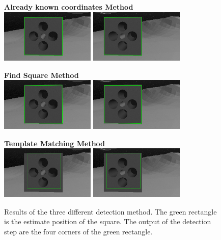 \begin{figure}[H]
	\centering
	
	\textbf{Already known coordinates Method}\\
	\includegraphics[width=4.5cm]{detection/clickDetLeft.png}
	\includegraphics[width=4.5cm]{detection/clickDetRight.png}\\
	\vspace{30px}
	
	\textbf{Find Square Method}\\
	\includegraphics[width=4.5cm]{detection/squareDetLeft.png}
	\includegraphics[width=4.5cm]{detection/squareDetRight.png}\\
	\vspace{30px}
		
	\textbf{Template Matching Method}\\
	\includegraphics[width=4.5cm]{detection/tempDetLeft.png}
	\includegraphics[width=4.5cm]{detection/tempDetRight.png}
	
	\caption[Hole Detection results with the three different methods]{Results of the three different detection method. The green rectangle is the estimate position of the square. The output of the detection step are the four corners of the green rectangle.}
	\label{fig:detectResults}
\end{figure}

